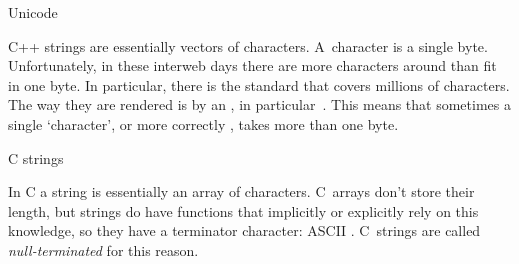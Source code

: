  {Unicode}

C++ strings are essentially vectors of characters. A~character is a
single byte. Unfortunately, in these interweb days there are more
characters around than fit in one byte. In particular, there is the
 standard that covers millions of
characters. The way they are rendered is by an
, in
particular~. This means that sometimes a single
`character', or more correctly , takes more than
one byte.


 {C strings}
\label{sec:cstring}

In C a string is essentially an array of characters. C~arrays don't
store their length, but strings do have functions that implicitly or
explicitly rely on this knowledge, so they have a terminator
character: ASCII . C~strings are called
\emph{null-terminated} for this reason.


